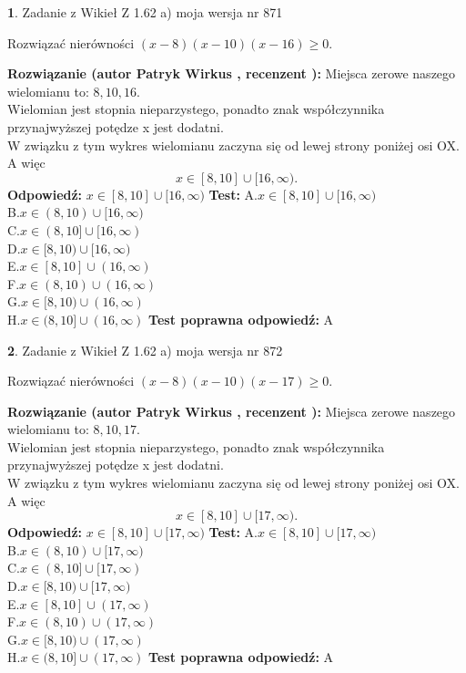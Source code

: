 \documentclass[12pt, a4paper]{article}
\theoremstyle{definition} %
\newtheorem{zad}{}
\newcommand{\zadStart}[1]{\begin{zad}#1\newline}
\newcommand{\zadStop}{\end{zad}}
\newcommand{\rozwStart}[2]{\noindent \textbf{Rozwiązanie (autor #1 , recenzent #2): }\newline}
\newcommand{\rozwStop}{\newline}
\newcommand{\odpStart}{\noindent \textbf{Odpowiedź:}\newline}
\newcommand{\odpStop}{\newline}
\newcommand{\testStart}{\noindent \textbf{Test:}\newline}
\newcommand{\testStop}{\newline}
\newcommand{\kluczStart}{\noindent \textbf{Test poprawna odpowiedź:}\newline}
\newcommand{\kluczStop}{\newline}
\begin{document}
\zadStart{Zadanie z Wikieł Z 1.62 a) moja wersja nr 871}

Rozwiązać nierówności $(x-8)(x-10)(x-16)\ge0$.
\zadStop
\rozwStart{Patryk Wirkus}{}
Miejsca zerowe naszego wielomianu to: $8, 10, 16$.\\
Wielomian jest stopnia nieparzystego, ponadto znak współczynnika przy\linebreak najwyższej potędze x jest dodatni.\\ W związku z tym wykres wielomianu zaczyna się od lewej strony poniżej osi OX. A więc $$x \in [8,10] \cup [16,\infty).$$
\rozwStop
\odpStart
$x \in [8,10] \cup [16,\infty)$
\odpStop
\testStart
A.$x \in [8,10] \cup [16,\infty)$\\
B.$x \in (8,10) \cup [16,\infty)$\\
C.$x \in (8,10] \cup [16,\infty)$\\
D.$x \in [8,10) \cup [16,\infty)$\\
E.$x \in [8,10] \cup (16,\infty)$\\
F.$x \in (8,10) \cup (16,\infty)$\\
G.$x \in [8,10) \cup (16,\infty)$\\
H.$x \in (8,10] \cup (16,\infty)$
\testStop
\kluczStart
A
\kluczStop



\zadStart{Zadanie z Wikieł Z 1.62 a) moja wersja nr 872}

Rozwiązać nierówności $(x-8)(x-10)(x-17)\ge0$.
\zadStop
\rozwStart{Patryk Wirkus}{}
Miejsca zerowe naszego wielomianu to: $8, 10, 17$.\\
Wielomian jest stopnia nieparzystego, ponadto znak współczynnika przy\linebreak najwyższej potędze x jest dodatni.\\ W związku z tym wykres wielomianu zaczyna się od lewej strony poniżej osi OX. A więc $$x \in [8,10] \cup [17,\infty).$$
\rozwStop
\odpStart
$x \in [8,10] \cup [17,\infty)$
\odpStop
\testStart
A.$x \in [8,10] \cup [17,\infty)$\\
B.$x \in (8,10) \cup [17,\infty)$\\
C.$x \in (8,10] \cup [17,\infty)$\\
D.$x \in [8,10) \cup [17,\infty)$\\
E.$x \in [8,10] \cup (17,\infty)$\\
F.$x \in (8,10) \cup (17,\infty)$\\
G.$x \in [8,10) \cup (17,\infty)$\\
H.$x \in (8,10] \cup (17,\infty)$
\testStop
\kluczStart
A
\kluczStop
\end{document}
